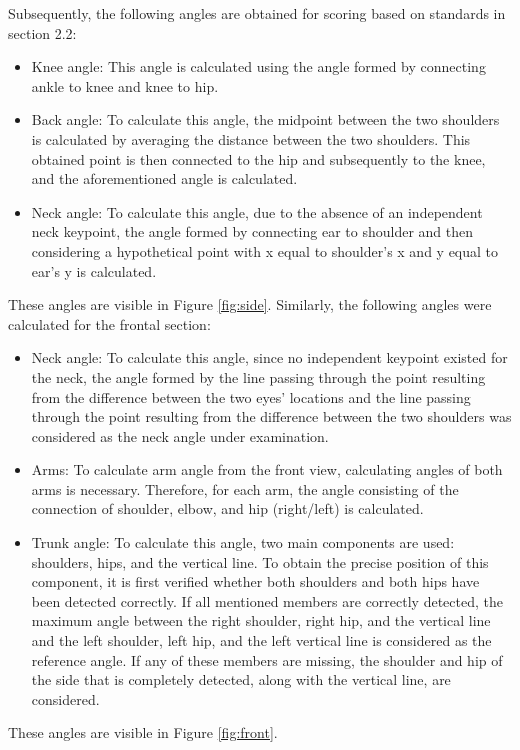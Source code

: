 \documentclass[lettersize,journal]{IEEEtran}
\begin{document}
Subsequently, the following angles are obtained for scoring based on standards in section 2.2:
\begin{itemize}
    \item Knee angle: This angle is calculated using the angle formed by connecting ankle to knee and knee to hip.
    \item Back angle: To calculate this angle, the midpoint between the two shoulders is calculated by averaging the distance between the two shoulders. This obtained point is then connected to the hip and subsequently to the knee, and the aforementioned angle is calculated.
    \item Neck angle: To calculate this angle, due to the absence of an independent neck keypoint, the angle formed by connecting ear to shoulder and then considering a hypothetical point with x equal to shoulder's x and y equal to ear's y is calculated.
\end{itemize}
These angles are visible in Figure \ref{fig:side}.
Similarly, the following angles were calculated for the frontal section:
\begin{itemize}
    \item Neck angle: To calculate this angle, since no independent keypoint existed for the neck, the angle formed by the line passing through the point resulting from the difference between the two eyes' locations and the line passing through the point resulting from the difference between the two shoulders was considered as the neck angle under examination.
    \item Arms: To calculate arm angle from the front view, calculating angles of both arms is necessary. Therefore, for each arm, the angle consisting of the connection of shoulder, elbow, and hip (right/left) is calculated.
    \item Trunk angle: To calculate this angle, two main components are used: shoulders, hips, and the vertical line. To obtain the precise position of this component, it is first verified whether both shoulders and both hips have been detected correctly. If all mentioned members are correctly detected, the maximum angle between the right shoulder, right hip, and the vertical line and the left shoulder, left hip, and the left vertical line is considered as the reference angle.
    If any of these members are missing, the shoulder and hip of the side that is completely detected, along with the vertical line, are considered.
\end{itemize}
These angles are visible in Figure \ref{fig:front}.
\end{document}
